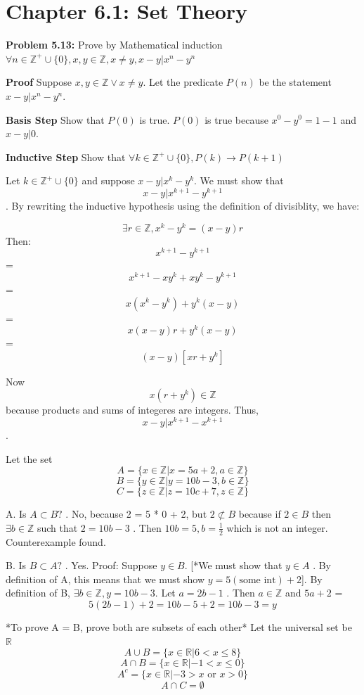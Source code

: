 \documentclass[12pt]{article}
\begin{document}
\section{Chapter 6.1: Set Theory}
\textbf{Problem 5.13:} Prove by Mathematical induction $\forall n \in \mathbb{Z}^+ \cup \{0\}, x,y \in \mathbb{Z}, x \neq y, x - y | x^n - y^n$

\textbf{Proof} Suppose $x,y \in \mathbb{Z} \vee x \neq y.$ Let the predicate $P(n)$ be the statement $x - y | x^n - y^n$.

\textbf{Basis Step} Show that $P(0)$ is true. $P(0)$ is true because $x^0 - y^0 = 1 - 1$ and $x - y | 0.$

\textbf{Inductive Step} Show that $\forall k \in \mathbb{Z}^+ \cup \{0\}, P(k) \rightarrow P(k + 1)$

Let $k \in \mathbb{Z}^+ \cup \{0\}$ and suppose $x - y | x^k - y^k$.
We must show that \[x - y | x^{k + 1} - y^{k + 1}\] .
By rewriting the inductive hypothesis using the definition of divisiblity, we have:

\[\exists r \in \mathbb{Z}, x^k - y^k = (x- y)r\]
Then: \[x^{k + 1} - y^{k + 1}\]
= \[x^{k + 1} - xy^k + xy^k - y^{k + 1}\]
= \[x(x^k - y^k) + y^k(x - y)\]
= \[x(x - y)r + y^k(x - y)\] %
= \[(x - y)[xr + y^k]\]

Now \[x(r + y^k) \in \mathbb{Z}\] because products and sums of integeres are integers. Thus, \[x - y | x^{k + 1} - x^{k + 1}\] .

Let the set \[A = \{x \in \mathbb{Z} | x = 5a + 2, a \in \mathbb{Z}\}\]
\[B = \{y \in \mathbb{Z} | y = 10b - 3, b \in \mathbb{Z}\}\]
\[C = \{z \in \mathbb{Z} | z = 10c + 7, z \in \mathbb{Z}\}\]

A. Is \( A \subset B? \) . No, because  2 = 5 * 0 + 2, but \(2 \not\subset B\) because if \(2 \in B\) then \(\exists b \in \mathbb{Z}\) such that \(2 = 10b - 3\) . Then \(10b = 5, b = \frac{1}{2} \) which is not an integer. Counterexample found.

B. Is \( B \subset A? \) . Yes. Proof: Suppose \( y \in B. \) [*We must show that \(y \in A\) . By definition of A, this means that we must show \(y = 5(\text{some int}) + 2\)].
By definition of B, \(\exists b \in \mathbb{Z}, y = 10b - 3.\)
Let \(a = 2b - 1\) . Then \(a \in \mathbb{Z}\) and \(5a + 2\) =
\[5(2b - 1) + 2 = 10b - 5 + 2 = 10b - 3 = y\]

*To prove A = B, prove both are subsets of each other*
Let the universal set be \(\mathbb{R}\)
\[A \cup B = \{x \in \mathbb{R} | 6 < x \leq 8 \}\]
\[A \cap B = \{x \in \mathbb{R} | -1 < x \leq 0 \}\]
\[A^c = \{x \in \mathbb{R} | -3 > x \text{ or } x > 0 \}\]
\[A \cap C = \emptyset\]
\end{document}
